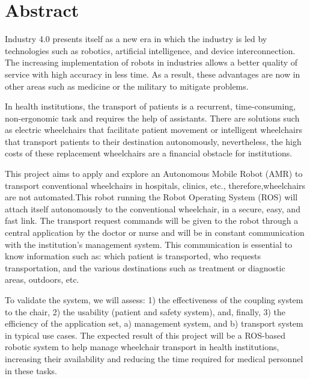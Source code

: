 \documentclass[runningheads]{llncs}
\begin{document}
\section*{Abstract}
Industry 4.0 presents itself as a new era in which the industry is led by technologies such as robotics, artificial intelligence, and device interconnection. The increasing implementation of robots in industries allows a better quality of service with high accuracy in less time. As a result, these advantages are now in other areas such as medicine or the military to mitigate problems.
\par
In health institutions, the transport of patients is a recurrent, time-consuming, non-ergonomic task and requires the help of assistants\cite{assistants}. There are solutions such as electric wheelchairs\cite{electricwheelchairs} that facilitate patient movement or intelligent wheelchairs\cite{intelligentwheelchairs} that transport patients to their destination autonomously, nevertheless, the high costs of these replacement wheelchairs are a financial obstacle for institutions.
\par
This project aims to apply and explore an Autonomous Mobile Robot (AMR) to transport conventional wheelchairs in hospitals, clinics, etc., therefore,wheelchairs are not automated.This robot running the Robot Operating System (ROS) will attach itself autonomously to the conventional wheelchair, in a secure, easy, and fast link. The transport request commands will be given to the robot through a central application by the doctor or nurse and will be in constant communication with the institution's management system. This communication is essential to know information such as: which patient is transported, who requests transportation, and the various destinations such as treatment or diagnostic areas, outdoors, etc.
\par
To validate the system, we will assess: 1) the effectiveness of the coupling system to the chair, 2) the usability (patient and safety system), and, finally, 3) the efficiency of the application set, a) management system, and b) transport system in typical use cases. The expected result of this project will be a ROS-based robotic system to help manage wheelchair transport in health institutions, increasing their availability and reducing the time required for medical personnel in these tasks.


%



%
%
%


%
\end{document}
